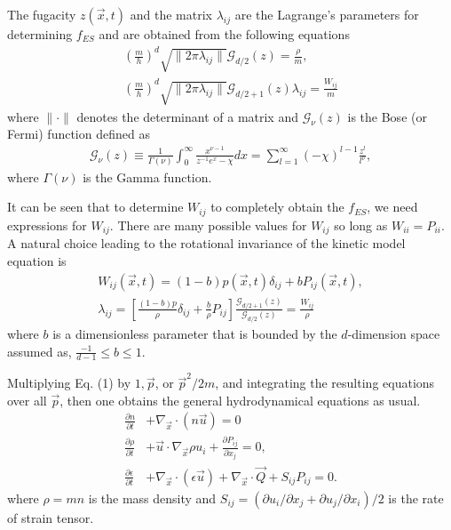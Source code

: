 \documentclass[doublecol]{epl2}
\begin{document}
The fugacity $z(\vec x,t)$ and the matrix $\lambda_{i j}$ are the Lagrange's parameters for determining $f_{ES}$ and are obtained from the following equations
\begin{align}
\left(\frac{m}{h}\right)^d \sqrt{ \|2 \pi \lambda_{i j}\| } \mathcal{G}_{d/2}(z) = \frac{\rho}{m}, \\
\left(\frac{m}{h}\right)^d \sqrt{ \|2 \pi \lambda_{i j}\| } \mathcal{G}_{d/2 +1}(z) \lambda_{i j} = \frac{W_{i j}}{m}
\end{align}
where $\| \cdot \|$ denotes the determinant of a matrix and $\mathcal{G}_{\nu}(z)$ is the Bose (or Fermi) function defined as
\begin{align}
\mathcal{G}_{\nu}(z) \equiv \frac{1}{\Gamma(\nu)} \int^{\infty}_0 \frac{ x^{\nu
-1} }{ {z^{-1} e^x - \chi}}dx = \sum^{\infty}_{l=1}
(-\chi)^{l-1} \frac{z^l}{l^{\nu}},
\end{align}
where $\Gamma(\nu)$ is the Gamma function.

It can be seen that to determine $W_{i j} $ to completely obtain the $f_{ES}$, we need expressions for $W_{i j}$.   There are many possible values for $W_{i j}$ so long as $W_{i i}=P_{i i}$.   A natural choice leading to the rotational invariance of the kinetic model equation is \cite{Holway1966}
\begin{align}
W_{i j}(\vec x, t) = (1 - b) p(\vec x, t) \delta_{i j} + b P_{i j}(\vec x, t), \\
\lambda_{i j} = \left[\frac{(1-b)p}{\rho} \delta_{i j}+ \frac{b}{\rho}P_{i j } \right] \frac{\mathcal{G}_{d/2+1}(z)}{\mathcal{G}_{d/2}(z)} = \frac{W_{i j}}{\rho}
\end{align}
where $b$ is a dimensionless parameter that is bounded by the $d$-dimension space assumed as, $\frac{-1}{d-1} \le b \le 1$.

Multiplying Eq. (1) by $1, \vec p$, or $\vec p^2/2m$, and integrating the resulting equations over all $\vec p$, then one obtains the general hydrodynamical equations as usual.
\begin{align}
\frac{\partial n}{\partial t} &+ \nabla_{\vec x} \cdot (n \vec u) = 0 \\
\frac{\partial \rho}{\partial t} &+ \vec u \cdot \nabla_{\vec x} \rho u_{i} + \frac{\partial P_{ij}}{\partial x_{j} } = 0, \\
\frac{\partial \epsilon}{\partial t} &+ \nabla_{\vec x} \cdot (\epsilon \vec u) + \nabla_{\vec x} \cdot \vec Q + S_{ij} P_{ij} = 0.
\end{align}
where $\rho=m n$ is the mass density and $S_{ij}=(\partial u_{i}/\partial x_{j} + \partial u_{j}/\partial x_{i})/2$ is the rate of strain tensor.
\end{document}
